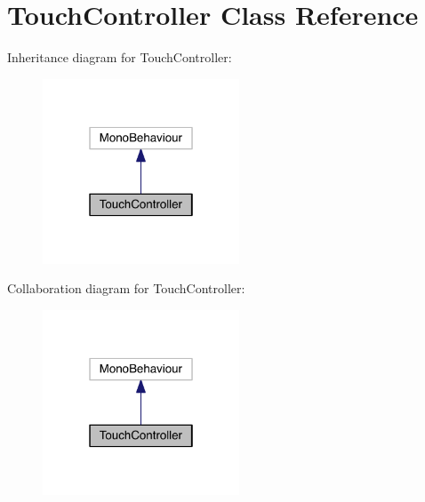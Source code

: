 \hypertarget{class_touch_controller}{}\section{Touch\+Controller Class Reference}
\label{class_touch_controller}


Inheritance diagram for Touch\+Controller\+:\nopagebreak
\begin{figure}[H]
\begin{center}
\leavevmode
\includegraphics[width=166pt]{class_touch_controller__inherit__graph}
\end{center}
\end{figure}


Collaboration diagram for Touch\+Controller\+:\nopagebreak
\begin{figure}[H]
\begin{center}
\leavevmode
\includegraphics[width=166pt]{class_touch_controller__coll__graph}
\end{center}
\end{figure}
